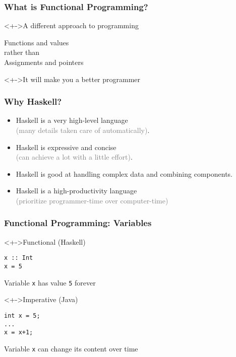 \documentclass{beamer}
\begin{document}
\begin{frame}
  \frametitle{What is Functional Programming?}
  \begin{block}<+->{A different approach to programming}
    \begin{LARGE}
      \begin{center}
        Functions and values
        \\[3ex]
        rather than
        \\[3ex]
        Assignments and pointers
      \end{center}
    \end{LARGE}
  \end{block}
  \begin{alertblock}<+->{It will make you a better programmer}
    
  \end{alertblock}
\end{frame}
\begin{frame}
  \frametitle{Why Haskell?}
  \begin{itemize}
  \item Haskell is a very high-level language
    \\\hfill\textcolor{gray}{(many details taken care
    of automatically)}. 
  \item Haskell is expressive and concise
    \\\hfill\textcolor{gray}{(can achieve a lot with a
    little effort)}. 
  \item Haskell is good at handling complex data and combining
    components. 
  \item Haskell is a high-productivity language \\\hfill\textcolor{gray}{ (prioritize programmer-time over computer-time)}
  \end{itemize}
\end{frame}

\begin{frame}[fragile]
  \frametitle{Functional Programming: Variables}
  \begin{block}<+->{Functional (Haskell)}
\begin{verbatim}
x :: Int
x = 5
\end{verbatim}
    Variable \texttt{x} has value \texttt{5} forever
  \end{block}
  \begin{block}<+->{Imperative (Java)}
\begin{verbatim}
int x = 5;
...
x = x+1;
\end{verbatim}
    Variable \texttt{x} can change its content over time
  \end{block}
\end{frame}
\end{document}

